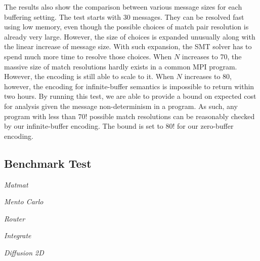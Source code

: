 The results also show the comparison between various message sizes for each buffering setting. The test starts with $30$ messages. They can be resolved fast using low memory, even though the possible choices of match pair resolution is already very large. However, the size of choices is expanded unusually along with the linear increase of message size. With such expansion, the SMT solver has to spend much more time to resolve those choices. When $\mathit{N}$ increases to 70, the massive size of match resolutions hardly exists in a common MPI program. However, the encoding is still able to scale to it. When $\mathit{N}$ increases to 80, however, the encoding for infinite-buffer semantics is impossible to return within two hours. By running this test, we are able to provide a bound on expected cost for analysis given the message non-determinism in a program. As such, any program with less than 70! possible match resolutions can be reasonably checked by our infinite-buffer encoding. The bound is set to 80! for our zero-buffer encoding.

\subsection{Benchmark Test}

\begin{compactitem}
\item \textit{Matmat} 
\item \textit{Mento Carlo}
\item \textit{Router}
\item \textit{Integrate}
\item \textit{Diffusion 2D}
\end{compactitem}

